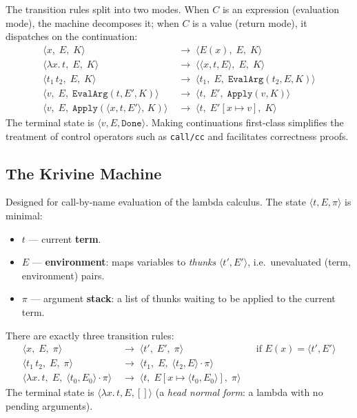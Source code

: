 \documentclass[11pt, a4paper]{article}
\theoremstyle{definition}
\theoremstyle{plain}
\theoremstyle{remark}
\begin{document}
The transition rules split into two modes.  When $C$ is an expression
(evaluation mode), the machine decomposes it; when $C$ is a value
(return mode), it dispatches on the continuation:
\begin{align*}
  \langle x,\; E,\; K \rangle
    &\;\to\; \langle E(x),\; E,\; K \rangle \\
  \langle \lambda x.\,t,\; E,\; K \rangle
    &\;\to\; \langle \langle x,t,E\rangle,\; E,\; K \rangle \\
  \langle t_1\, t_2,\; E,\; K \rangle
    &\;\to\; \langle t_1,\; E,\; \mathtt{EvalArg}(t_2, E, K) \rangle \\[4pt]
  \langle v,\; E,\; \mathtt{EvalArg}(t, E', K) \rangle
    &\;\to\; \langle t,\; E',\; \mathtt{Apply}(v, K) \rangle \\
  \langle v,\; E,\; \mathtt{Apply}(\langle x,t,E'\rangle,\, K) \rangle
    &\;\to\; \langle t,\; E'[x \mapsto v],\; K \rangle
\end{align*}
The terminal state is $\langle v, E, \mathtt{Done} \rangle$.  Making
continuations first-class simplifies the treatment of control operators
such as \texttt{call/cc} and facilitates correctness proofs.

\subsection{The Krivine Machine}

Designed for call-by-name evaluation of the lambda calculus.  The state
$\langle t, E, \pi \rangle$ is minimal:
\begin{itemize}
  \item $t$ --- current \textbf{term}.
  \item $E$ --- \textbf{environment}: maps variables to \emph{thunks}
        $\langle t', E' \rangle$, i.e.\ unevaluated (term, environment) pairs.
  \item $\pi$ --- argument \textbf{stack}: a list of thunks waiting to be
        applied to the current term.
\end{itemize}

There are exactly three transition rules:
\begin{align*}
  \langle x,\; E,\; \pi \rangle
    &\;\to\; \langle t',\; E',\; \pi \rangle
    &&\text{if } E(x) = \langle t', E' \rangle
    \tag{Var} \\
  \langle t_1\, t_2,\; E,\; \pi \rangle
    &\;\to\; \langle t_1,\; E,\; \langle t_2, E \rangle \cdot \pi \rangle
    \tag{App} \\
  \langle \lambda x.\,t,\; E,\; \langle t_0, E_0 \rangle \cdot \pi \rangle
    &\;\to\; \langle t,\; E[x \mapsto \langle t_0, E_0 \rangle],\; \pi \rangle
    \tag{Lam}
\end{align*}
The terminal state is $\langle \lambda x.\,t, E, [] \rangle$ (a
\emph{head normal form}: a lambda with no pending arguments).
\end{document}
